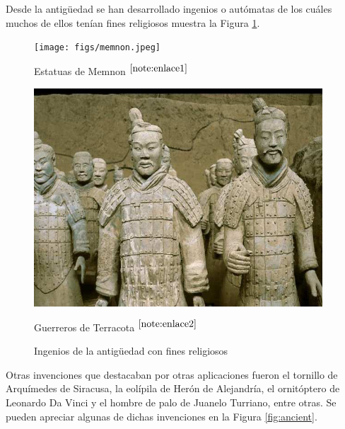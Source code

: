 Desde la antigüedad se han desarrollado ingenios o autómatas de los cuáles muchos de ellos tenían fines religiosos  muestra la Figura \ref{fig:ancientrel}.   \\


\begin{figure}[ht!]
	\centering
	\begin{minipage}{0.4\linewidth}
		\centering
		\texttt{[image: figs/memnon.jpeg]}
		\caption*{\centering Estatuas de Memnon $^{\ref{note:enlace1}}$} %
	\end{minipage}
	\hspace{2cm}
	\begin{minipage}{0.35\linewidth}
		\centering
		\includegraphics[width=\linewidth]{figs/terracota.png}
		\caption*{\centering Guerreros de Terracota $^{\ref{note:enlace2}}$} %
	\end{minipage}
	\caption{Ingenios de la antigüedad con fines religiosos}
	\label{fig:ancientrel}
\end{figure}


\setcounter{footnote}{1} %

\setcounter{footnote}{2} %
 
Otras invenciones que destacaban por otras aplicaciones fueron el tornillo de Arquímedes de Siracusa, la eolípila de Herón de Alejandría, el ornitóptero de Leonardo Da Vinci y el hombre de palo de Juanelo Turriano, entre otras. Se pueden apreciar algunas de dichas invenciones en la Figura \ref{fig:ancient}.\\

